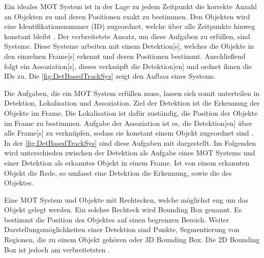 Ein ideales \gls{MOT} System ist in der Lage zu jedem Zeitpunkt die korrekte Anzahl an Objekten zu  und deren Positionen exakt zu bestimmen. Den Objekten wird eine Identifikationsnummer (\acrshort{ID}) zugeordnet, welche über alle Zeitpunkte hinweg konstant bleibt \cite{CLEAR.2008}. Der verbreitetste Ansatz, um diese Aufgaben zu erfüllen, sind  Systeme. Diese Systeme arbeiten mit einem \gls{Detektion}[s], welches die Objekte in den einzelnen \gls{Frame}[s] erkennt und deren Positionen bestimmt. Anschließend folgt ein \gls{Assoziation}[s], dieses verknüpft die \gls{Detektion}[en] und ordnet ihnen die \acrshort{ID}s zu\cite{Luo.2022, HOTA}. Die \autoref{fig:DetBasedTrackSys} zeigt den Aufbau eines  Systems. 



Die Aufgaben, die ein \gls{MOT} System erfüllen muss, lassen sich somit unterteilen in \gls{Detektion}, \gls{Lokalisation} und \gls{Assoziation}. Ziel der \gls{Detektion} ist die Erkennung der Objekte im \gls{Frame}. Die \gls{Lokalisation} ist dafür zuständig, die Position der Objekte im \gls{Frame} zu bestimmen. Aufgabe der \gls{Assoziation} ist es, die \gls{Detektion}[en] über alle \gls{Frame}[s] zu verknüpfen, sodass sie konstant einem Objekt zugeordnet sind \cite{CLEAR.2008, HOTA}. In der \autoref{fig:DetBasedTrackSys} sind diese Aufgaben mit dargestellt. Im Folgenden wird unterschieden zwischen der \gls{Detektion} als Aufgabe eines \gls{MOT} Systems und einer \gls{Detektion} als erkanntes Objekt in einem \gls{Frame}. Ist von einem erkannten Objekt die Rede, so umfasst eine \gls{Detektion} die Erkennung, sowie die  des Objektes. \par

Eine \gls{MOT} System  und  Objekte mit Rechtecken, welche möglichst eng um das Objekt gelegt werden. Ein solches Rechteck wird \gls{Bounding Box} genannt. Es bestimmt die Position des Objektes auf einen begrenzen Bereich. Weiter Darstellungsmöglichkeiten einer \gls{Detektion} sind Punkte, Segmentierung von Regionen, die zu einem Objekt gehören oder 3D \gls{Bounding Box}. Die 2D \gls{Bounding Box} ist jedoch am verbreitetsten \cite{MOT15, HOTA, Luo.2022}. \par 

